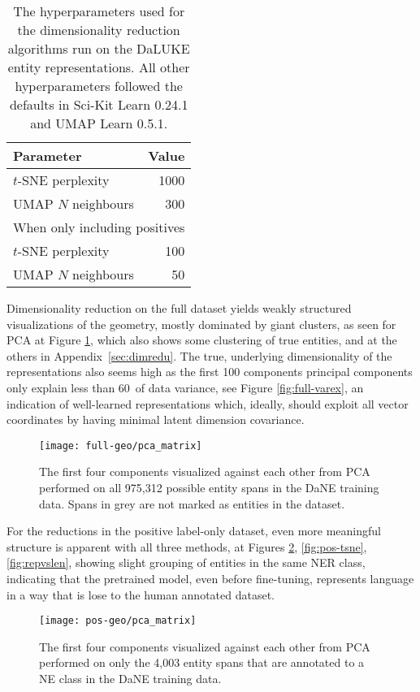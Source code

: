 \documentclass[main.tex]{subfiles}
\begin{document}
\begin{table}[H]
    \centering
    \begin{tabular}{l|r}
        Parameter           &  Value\\\hline
        $t$-SNE perplexity  &  1000   \\
        UMAP $N$ neighbours &  300\\\hline
        \multicolumn{2}{c}{When only including positives}\\\hline
        $t$-SNE perplexity  & 100\\
        UMAP $N$ neighbours & 50
    \end{tabular}
    \caption{
        The hyperparameters used for the dimensionality reduction algorithms run on the DaLUKE entity representations.
        All other hyperparameters followed the defaults in Sci-Kit Learn 0.24.1 and UMAP Learn 0.5.1.
    }\label{tab:dimreducer-hyper}
\end{table}\noindent
Dimensionality reduction on the full dataset yields weakly structured visualizations of the geometry, mostly dominated by giant clusters, as seen for PCA at Figure \ref{fig:all-pca}, which also shows some clustering of true entities, and at the others in Appendix~\ref{sec:dimredu}.
The true, underlying dimensionality of the representations also seems high as the first 100 components principal components only explain less than 60\pro\ of data variance, see Figure \ref{fig:full-varex}, an indication of well-learned representations which, ideally, should exploit all vector coordinates by having minimal latent dimension covariance.

\begin{figure}[H]
    \centering
        \texttt{[image: full-geo/pca\_matrix]}
    \caption{
        The first four components visualized against each other from PCA performed on all 975,312 possible entity spans in the DaNE training data.
        Spans in grey are not marked as entities in the dataset.
    }
    \label{fig:all-pca}
\end{figure}\noindent
For the reductions in the positive label-only dataset, even more meaningful structure is apparent with all three methods, at Figures \ref{fig:pos-pca}, \ref{fig:pos-tsne}, \ref{fig:repvslen}, showing slight grouping of entities in the same NER class, indicating that the pretrained model, even before fine-tuning, represents language in a way that is lose to the human annotated dataset.

\begin{figure}[H]
    \centering
        \texttt{[image: pos-geo/pca\_matrix]}
    \caption{
        The first four components visualized against each other from PCA performed on only the 4,003 entity spans that are annotated to a NE class in the DaNE training data.
    }
    \label{fig:pos-pca}
\end{figure}\noindent
\end{document}
